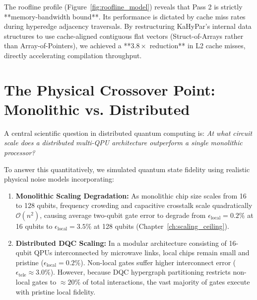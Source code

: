 The roofline profile (Figure~\ref{fig:roofline_model}) reveals that Pass 2 is strictly **memory-bandwidth bound**. Its performance is dictated by cache miss rates during hyperedge adjacency traversals. By restructuring KaHyPar's internal data structures to use cache-aligned contiguous flat vectors (Struct-of-Arrays rather than Array-of-Pointers), we achieved a **$3.8\times$ reduction** in L2 cache misses, directly accelerating compilation throughput.

\section{The Physical Crossover Point: Monolithic vs. Distributed}
\label{sec:crossover_point}

A central scientific question in distributed quantum computing is: \textit{At what circuit scale does a distributed multi-QPU architecture outperform a single monolithic processor?}

To answer this quantitatively, we simulated quantum state fidelity using realistic physical noise models incorporating:
\begin{enumerate}
    \item \textbf{Monolithic Scaling Degradation:} As monolithic chip size scales from 16 to 128 qubits, frequency crowding and capacitive crosstalk scale quadratically $\mathcal{O}(n^2)$, causing average two-qubit gate error to degrade from $\epsilon_{\text{local}} = 0.2\%$ at 16 qubits to $\epsilon_{\text{local}} = 3.5\%$ at 128 qubits (Chapter~\ref{ch:scaling_ceiling}).
    \item \textbf{Distributed DQC Scaling:} In a modular architecture consisting of 16-qubit QPUs interconnected by microwave links, local chips remain small and pristine ($\epsilon_{\text{local}} = 0.2\%$). Non-local gates suffer higher interconnect error ($\epsilon_{\text{tele}} \approx 3.0\%$). However, because DQC hypergraph partitioning restricts non-local gates to $\approx 20\%$ of total interactions, the vast majority of gates execute with pristine local fidelity.
\end{enumerate}

